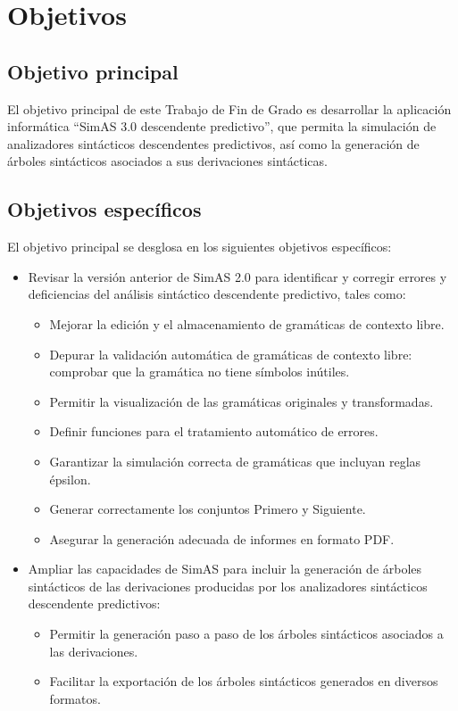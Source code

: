 \chapter{Objetivos} \label{cap:objetivos}
\section{Objetivo principal}

El objetivo principal de este Trabajo de Fin de Grado es desarrollar la aplicación informática ``SimAS 3.0 descendente predictivo'', que permita la simulación de analizadores sintácticos descendentes predictivos, así como la generación de árboles sintácticos asociados a sus derivaciones sintácticas.

\section{Objetivos específicos}

El objetivo principal se desglosa en los siguientes objetivos específicos:

\begin{itemize}
    \item Revisar la versión anterior de SimAS 2.0 \cite{juan} para identificar y corregir errores y deficiencias del análisis sintáctico descendente predictivo,  tales como:
    \begin{itemize}
        \item Mejorar la edición  y el almacenamiento de gramáticas de contexto libre.
        \item Depurar la validación automática de gramáticas de contexto libre: comprobar que la gramática no tiene símbolos inútiles.
        \item Permitir la visualización de las gramáticas originales y transformadas.
        \item Definir funciones para el tratamiento automático de errores.
        \item Garantizar la simulación correcta de gramáticas que incluyan reglas épsilon.
        \item Generar correctamente los conjuntos Primero y Siguiente.
        \item Asegurar la generación adecuada de informes en formato PDF.
    \end{itemize}
    \item Ampliar las capacidades de SimAS para incluir la generación de árboles sintácticos de las derivaciones producidas por los analizadores sintácticos descendente predictivos:
    \begin{itemize}
        \item Permitir la generación paso a paso de los árboles sintácticos asociados a las derivaciones.
        \item Facilitar la exportación de los árboles sintácticos generados en diversos formatos.
    \end{itemize}
\end{itemize}


